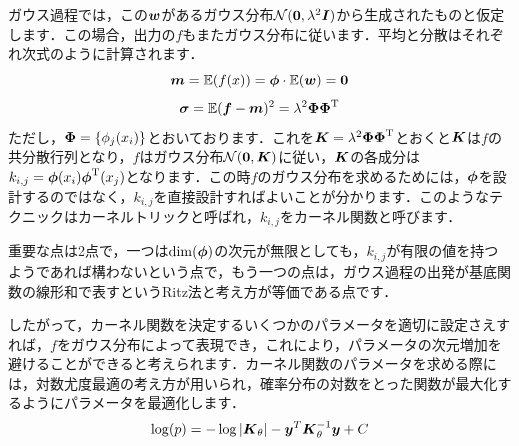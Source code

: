 \documentclass[11pt]{jsarticle}
\begin{document}
			ガウス過程では，この$ \boldsymbol{w} $があるガウス分布$ \mathcal{N}(\boldsymbol{0},\lambda^2 \boldsymbol{I}) $から生成されたものと仮定します．この場合，出力の$ f $もまたガウス分布に従います．平均と分散はそれぞれ次式のように計算されます．
			\begin{equation}\label{eq:Avg}
				\boldsymbol{m} = \mathbb{E}(f(x)) = \boldsymbol{\phi} \cdot \mathbb{E}( \boldsymbol{w}) = \boldsymbol{0}
			\end{equation}
			\begin{equation}\label{eq:Var}
				\boldsymbol{\sigma} = \mathbb{E}(\boldsymbol{f} - \boldsymbol{m})^2 = \lambda^2  \boldsymbol{\Phi}  \boldsymbol{\Phi}^{\mathrm{T}}
			\end{equation}
			ただし，$ \boldsymbol{\Phi} =\{\phi_j(x_i) \}$とおいております．これを$ \boldsymbol{K} = \lambda^2  \boldsymbol{\Phi}  \boldsymbol{\Phi}^{\mathrm{T}} $とおくと$ \boldsymbol{K} $は$ f $の共分散行列となり，$ f $はガウス分布$ \mathcal{N}(\boldsymbol{0},\boldsymbol{K}) $に従い，$ \boldsymbol{K} $の各成分は$ k_{i,j} = \boldsymbol{\phi}(x_i) \boldsymbol{\phi}^{\mathrm{T}}(x_j) $となります．この時$ f $のガウス分布を求めるためには，$ \boldsymbol{\phi} $を設計するのではなく，$ k_{i,j} $を直接設計すればよいことが分かります．このようなテクニックはカーネルトリックと呼ばれ，$ k_{i,j} $をカーネル関数と呼びます．
			
			重要な点は2点で，一つは$ \dim(\boldsymbol{\phi}) $の次元が無限としても，$ k_{i,j} $が有限の値を持つようであれば構わないという点で，もう一つの点は，ガウス過程の出発が基底関数の線形和で表すというRitz法と考え方が等価である点です．
			
			したがって，カーネル関数を決定するいくつかのパラメータを適切に設定さえすれば，$ f $をガウス分布によって表現でき，これにより，パラメータの次元増加を避けることができると考えられます．カーネル関数のパラメータを求める際には，対数尤度最適の考え方が用いられ，確率分布の対数をとった関数が最大化するようにパラメータを最適化します．
			\begin{equation}\label{eq:Suudo}
			\log(p) = -\log|\boldsymbol{K}_{\theta}| - \boldsymbol{y}^T \boldsymbol{K}_{\theta}^{-1} \boldsymbol{y}+C
			\end{equation}
			
\end{document}
